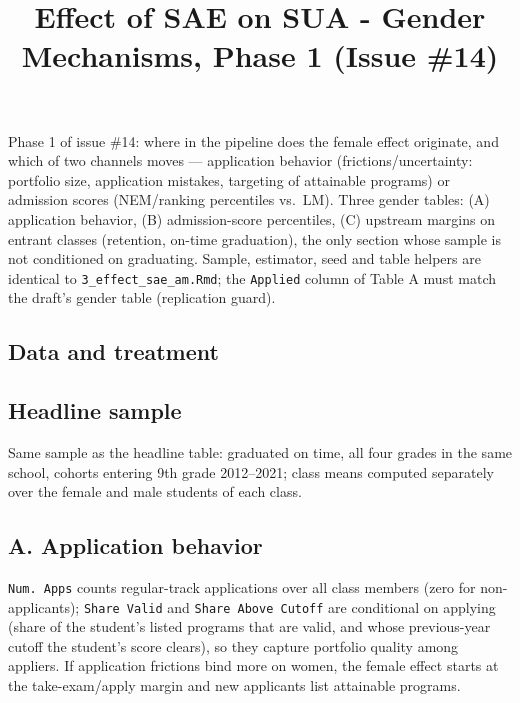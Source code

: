 \documentclass[
]{article}
\title{Effect of SAE on SUA - Gender Mechanisms, Phase 1 (Issue \#14)}
\author{}
\date{\vspace{-2.5em}}
\begin{document}
\maketitle

Phase 1 of issue \#14: where in the pipeline does the female effect
originate, and which of two channels moves --- application behavior
(frictions/uncertainty: portfolio size, application mistakes, targeting
of attainable programs) or admission scores (NEM/ranking percentiles
vs.~LM). Three gender tables: (A) application behavior, (B)
admission-score percentiles, (C) upstream margins on entrant classes
(retention, on-time graduation), the only section whose sample is not
conditioned on graduating. Sample, estimator, seed and table helpers are
identical to \texttt{3\_effect\_sae\_am.Rmd}; the \texttt{Applied}
column of Table A must match the draft's gender table (replication
guard).

\hypertarget{data-and-treatment}{%
\subsection{Data and treatment}\label{data-and-treatment}}

\hypertarget{headline-sample}{%
\subsection{Headline sample}\label{headline-sample}}

Same sample as the headline table: graduated on time, all four grades in
the same school, cohorts entering 9th grade 2012--2021; class means
computed separately over the female and male students of each class.

\hypertarget{a.-application-behavior}{%
\subsection{A. Application behavior}\label{a.-application-behavior}}

\texttt{Num.\ Apps} counts regular-track applications over all class
members (zero for non-applicants); \texttt{Share\ Valid} and
\texttt{Share\ Above\ Cutoff} are conditional on applying (share of the
student's listed programs that are valid, and whose previous-year cutoff
the student's score clears), so they capture portfolio quality among
appliers. If application frictions bind more on women, the female effect
starts at the take-exam/apply margin and new applicants list attainable
programs.
\end{document}
